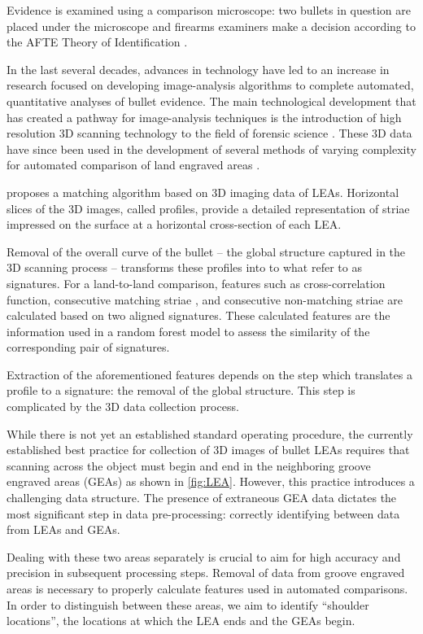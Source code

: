 \documentclass[]{article}
\begin{document}
Evidence is examined using a comparison microscope: two bullets in
question are placed under the microscope and firearms examiners make a
decision according to the AFTE Theory of Identification \citep{AFTE}.

In the last several decades, advances in technology have led to an
increase in research focused on developing image-analysis algorithms to
complete automated, quantitative analyses of bullet evidence. The main
technological development that has created a pathway for image-analysis
techniques is the introduction of high resolution 3D scanning technology
to the field of forensic science
\citep[e.g.][]{DeKinder1, DeKinder2, Bachrach1}. These 3D data have
since been used in the development of several methods of varying
complexity for automated comparison of land engraved areas
\citep[e.g.][]{Ma1, Chu1, Chu2, Hare1}.

\citet{Hare1} proposes a matching algorithm based on 3D imaging data of
LEAs. Horizontal slices of the 3D images, called profiles, provide a
detailed representation of striae impressed on the surface at a
horizontal cross-section of each LEA.

Removal of the overall curve of the bullet -- the global structure
captured in the 3D scanning process -- transforms these profiles into to
what \citet{Hare1} refer to as signatures. For a land-to-land
comparison, features such as cross-correlation function, consecutive
matching striae \citep[see][]{Biasotti}, and consecutive non-matching
striae are calculated based on two aligned signatures. These calculated
features are the information used in a random forest model to assess the
similarity of the corresponding pair of signatures.

Extraction of the aforementioned features depends on the step which
translates a profile to a signature: the removal of the global
structure. This step is complicated by the 3D data collection process.

While there is not yet an established standard operating procedure, the
currently established best practice for collection of 3D images of
bullet LEAs requires that scanning across the object must begin and end
in the neighboring groove engraved areas (GEAs) as shown in
\autoref{fig:LEA}. However, this practice introduces a challenging data
structure. The presence of extraneous GEA data dictates the most
significant step in data pre-processing: correctly identifying between
data from LEAs and GEAs.

Dealing with these two areas separately is crucial to aim for high
accuracy and precision in subsequent processing steps. Removal of data
from groove engraved areas is necessary to properly calculate features
used in automated comparisons. In order to distinguish between these
areas, we aim to identify ``shoulder locations'', the locations at which
the LEA ends and the GEAs begin.
\end{document}
